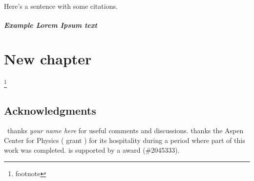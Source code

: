 \documentclass[12pt, oneside]{report}    %
\let\oldchapter\chapter
\def\chapter{%
  \setcounter{sidenote}{1}%
  \oldchapter
}
\begin{document}

Here's a sentence with some citations.\sidenote{
    \scriptsize\lipsum[10]}

\lipsum[1] \lipsum[1]



\paragraph{Example \emph{Lorem Ipsum} text} \lipsum[5]

% 
% 
% 
% 
% 



\chapter{New chapter}

\lipsum[1]
 \lipsum[1]\footnote{footnote}

\section*{Acknowledgments}

\ thanks 
\emph{your name here}
for useful comments and discussions. 
%
 thanks 
    the Aspen Center for Physics ( grant )
    for 
    its 
    hospitality during a period where part of this work was completed. 
%
 is supported by a  award (\#2045333).



% 
\end{document}
